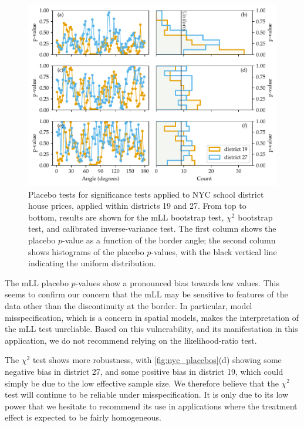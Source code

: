\begin{figure}[tbp]
    \centering
    \includegraphics[width=\textwidth]{figures/NYC_placebos.pdf}
    \caption{
        \label{fig:nyc_placebos}
        Placebo tests for significance tests applied to NYC school district house prices, applied within districts 19 and 27. From top to bottom, results are shown for the mLL bootstrap test, \(\chi^2\) bootstrap test, and calibrated inverse-variance test. The first column shows the placebo \(p\)-value as a function of the border angle; the second column shows histograms of the placebo \(p\)-values, with the black vertical line indicating the uniform distribution.
    }
\end{figure}

    The mLL placebo \(p\)-values show a pronounced bias towards low values.
This seems to confirm our concern that the mLL may be sensitive to features of the data other than the discontinuity at the border.
In particular, model misspecification, which is a concern in spatial models, makes the interpretation of the mLL test unreliable.
Based on this vulnerability, and its manifestation in this application, we do not recommend relying on the likelihood-ratio test.

    The \(\chi^2\) test shows more robustness, with \autoref{fig:nyc_placebos}(d) showing some negative bias in district 27, and some positive bias in district 19, which could simply be due to the low effective sample size.
We therefore believe that the \(\chi^2\) test will continue to be reliable under misspecification.
It is only due to its low power that we hesitate to recommend its use in applications where the treatment effect is expected to be fairly homogeneous.

